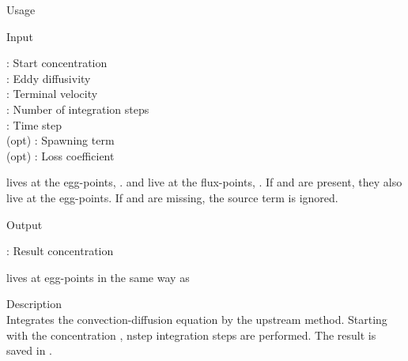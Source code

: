 {\begin{tdesc}
\item[Usage] 
\item[Input]
  \begin{vartab}
    \> : \> Start concentration \>  [eggs/m$^3$] \\
     \> : \> Eddy diffusivity    \>  [\sqmps]  \\
     \> : \> Terminal velocity   \>  [\mps]  \\
    \> : \> Number of integration steps \\
       \> : \> Time step           \>  [s] \\
       (opt) \> : \> Spawning term       \>  [eggs/m$^3$/s] \\
   (opt) \> : \> Loss coefficient \> [1/s] 
  \end{vartab}
   lives at the egg-points, .
   and  live at the flux-points, .
  If  and  are present, they also live at the egg-points.
  If  and  are missing, the source term is ignored. 
\item[Output]
  \begin{vartab}
   \>  : \> Result concentration \> [eggs/m$^3$]
  \end{vartab}
   lives at egg-points in the same way as 
\item[Description]\mbox{}\\
  Integrates the convection-diffusion equation by the 
  upstream method. Starting with the concentration ,
  nstep integration steps are performed. The result is 
  saved in .
\end{tdesc}


}

